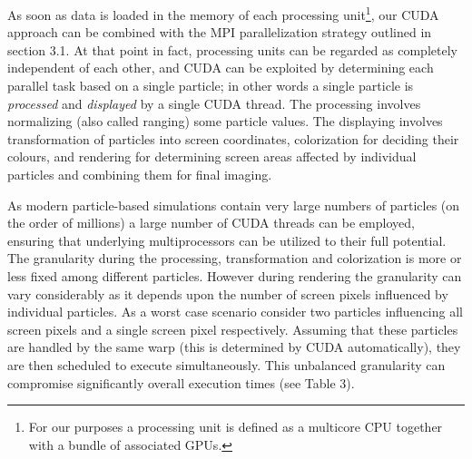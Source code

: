 \documentclass[1p,times]{elsarticle}
\begin{document}
As soon as data is loaded in the memory of each processing unit\footnote{For our purposes a processing unit is defined as a multicore CPU together with a bundle of associated GPUs.}, our CUDA approach can be combined with the MPI parallelization strategy outlined in section 3.1. At that point in fact, processing units can be regarded as completely independent of each other, and CUDA can be exploited by determining each parallel task based on a single particle; in other 
words a single particle is {\it processed} and {\it displayed} by a single CUDA thread. 
The processing involves normalizing (also called ranging) some particle values. 
The displaying involves transformation of particles into screen coordinates, colorization 
for deciding their colours, and rendering for determining screen areas affected by individual particles and combining them for final imaging.


As modern particle-based simulations contain very large numbers of particles 
(on the order of millions) a large number of CUDA threads can be employed,
ensuring that underlying multiprocessors can be utilized to their full potential. 
The granularity during the processing, transformation and colorization is more or 
less fixed among different particles. However during rendering the granularity 
can vary considerably as it depends upon the number of screen pixels influenced 
by individual particles. As a worst case scenario consider two particles influencing 
all screen pixels and a single screen pixel respectively. Assuming that these 
particles are handled by the same warp (this is determined by CUDA automatically), 
they are then scheduled to execute simultaneously. This unbalanced granularity 
can compromise significantly overall execution times (see Table 3).

\end{document}
